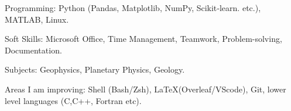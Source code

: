 \begin{cvskills}

  \cvskill
    {Programming:} %
    {Python (Pandas, Matplotlib, NumPy, Scikit‑learn. etc.), MATLAB, Linux.} %

  \cvskill
    {Soft Skills:} %
    {Microsoft Office, Time Management, Teamwork, Problem-solving, Documentation.} %


  \cvskill
    {Subjects:} %
    {Geophysics, Planetary Physics, Geology. } %

  \cvskill
    {Areas I am improving:} %
    {Shell (Bash/Zsh), \LaTeX (Overleaf/VScode), Git, lower level languages (C,C++, Fortran etc).} %

\end{cvskills}

